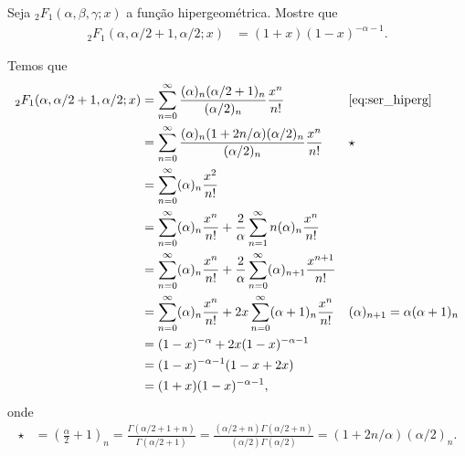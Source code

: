 \documentclass[a4paper,10pt, leqno, answers]{exam}  %
\begin{document}
\begin{questions}
    \question[Exame de 2011] Seja ${}_2F_1(\alpha, \beta, \gamma; x)$ a fun\c{c}\~{a}o hipergeom\'{e}trica. Mostre que
    \begin{align*}
        {}_2F_1(\alpha, \alpha/2 + 1, \alpha/2; x) &= (1 + x)(1 - x)^{-\alpha - 1}.
    \end{align*}
    \begin{solution}
        Temos que
        \begin{align*}
            {}_2F_1(\alpha, \alpha/2 + 1, \alpha/2; x) &= \sum_{n = 0}^\infty \frac{(\alpha)_n (\alpha/2 + 1)_n}{(\alpha/2)_n} \frac{x^n}{n!} && \text{\eqref{eq:ser_hiperg}} \\
            &= \sum_{n = 0}^\infty \frac{(\alpha)_n (1 + 2 n / \alpha)(\alpha/2)_n}{(\alpha/2)_ n} \frac{x^n}{n!} && \star \\
            &= \sum_{n = 0}^\infty (\alpha)_n \frac{x^2}{n!} \\
            &= \sum_{n = 0}^\infty (\alpha)_n \frac{x^n}{n!} + \frac{2}{\alpha} \sum_{n = 1}^\infty n(\alpha)_n \frac{x^n}{n!} \\
            &= \sum_{n = 0}^\infty (\alpha)_n \frac{x^n}{n!} + \frac{2}{\alpha} \sum_{n = 0}^\infty (\alpha)_{n + 1} \frac{x^{n + 1}}{n!} \\
            &= \sum_{n = 0}^\infty (\alpha)_n \frac{x^n}{n!} + 2x \sum_{n = 0}^\infty (\alpha + 1)_n \frac{x^n}{n!} && (\alpha)_{n + 1} = \alpha (\alpha + 1)_n \\
            &= (1 - x)^{-\alpha} + 2 x (1 - x)^{-\alpha - 1} \\
            &= (1 - x)^{- \alpha - 1} (1 - x + 2x) \\
            &=(1 + x)(1 - x)^{-\alpha - 1},
        \end{align*}
        onde
        \begin{align*}
            \star &= \left( \frac{\alpha}{2} + 1 \right)_n = \frac{\Gamma(\alpha/2 + 1 + n)}{\Gamma(\alpha/2 + 1)} = \frac{(\alpha/2 + n) \Gamma(\alpha/2 + n)}{(\alpha/2) \Gamma(\alpha/2)} = (1 + 2n/\alpha) (\alpha/2)_n.
        \end{align*}
    \end{solution}
\end{questions}


\end{document}
